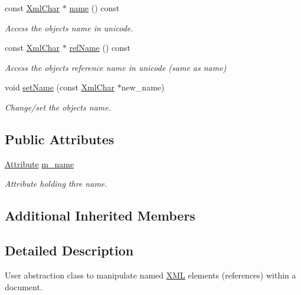 \begin{DoxyCompactItemize}
const \hyperlink{namespace_d_d4hep_1_1_x_m_l_a09e5d9cc86ed782f6826dfe0778c1815}{Xml\+Char} $\ast$ \hyperlink{class_d_d4hep_1_1_x_m_l_1_1_ref_element_ace0e349adbfe709358d16fe2e5b1ecac}{name} () const
\begin{DoxyCompactList}\small\item\em Access the object\textquotesingle{}s name in unicode. \end{DoxyCompactList}\item 
const \hyperlink{namespace_d_d4hep_1_1_x_m_l_a09e5d9cc86ed782f6826dfe0778c1815}{Xml\+Char} $\ast$ \hyperlink{class_d_d4hep_1_1_x_m_l_1_1_ref_element_ac4e667bfad7e45e032936fb1fde58791}{ref\+Name} () const
\begin{DoxyCompactList}\small\item\em Access the object\textquotesingle{}s reference name in unicode (same as name) \end{DoxyCompactList}\item 
void \hyperlink{class_d_d4hep_1_1_x_m_l_1_1_ref_element_ab466a91b8e0dd13e48ae8a74662b92d5}{set\+Name} (const \hyperlink{namespace_d_d4hep_1_1_x_m_l_a09e5d9cc86ed782f6826dfe0778c1815}{Xml\+Char} $\ast$new\+\_\+name)
\begin{DoxyCompactList}\small\item\em Change/set the object\textquotesingle{}s name. \end{DoxyCompactList}\end{DoxyCompactItemize}
\subsection*{Public Attributes}
\begin{DoxyCompactItemize}
\item 
\hyperlink{namespace_d_d4hep_1_1_x_m_l_a5c19b7116be99d69b4b22d911357baaf}{Attribute} \hyperlink{class_d_d4hep_1_1_x_m_l_1_1_ref_element_a581df5a2c94d0c6ed1bacce5e478928d}{m\+\_\+name}
\begin{DoxyCompactList}\small\item\em Attribute holding thre name. \end{DoxyCompactList}\end{DoxyCompactItemize}
\subsection*{Additional Inherited Members}


\subsection{Detailed Description}
User abstraction class to manipulate named \hyperlink{namespace_d_d4hep_1_1_x_m_l}{X\+ML} elements (references) within a document. 

